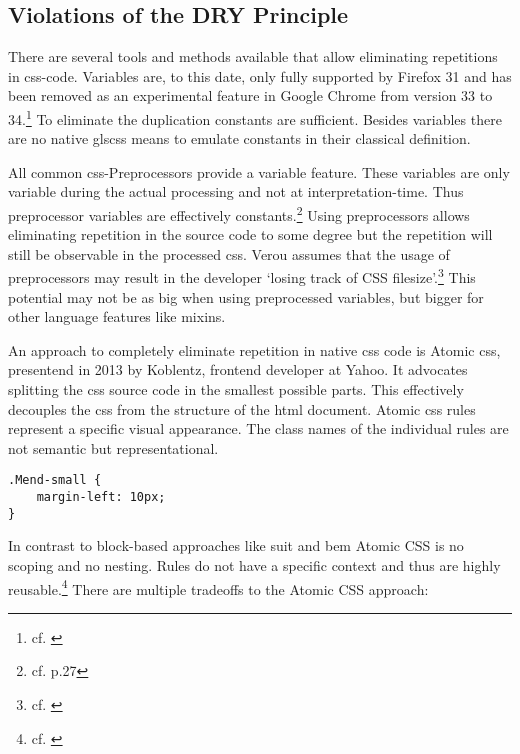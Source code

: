 \subsection{Violations of the DRY Principle}
There are several tools and methods available that allow eliminating repetitions in \gls{css}-code.
Variables are, to this date, only fully supported by Firefox 31 and has been removed as an experimental feature in Google Chrome from version 33 to 34.\footnote{cf. \cite{cssvariables}}
To eliminate the duplication constants are sufficient.
Besides variables there are no native gls{css} means to emulate constants in their classical definition.

All common \gls{css}-Preprocessors provide a variable feature.
These variables are only variable during the actual processing and not at interpretation-time.
Thus preprocessor variables are effectively constants.\footnote{cf. \cite{wirthpreprocessors} p.27}
Using preprocessors allows eliminating repetition in the source code to some degree
but the repetition will still be observable in the processed \gls{css}.
Verou assumes that the usage of preprocessors may result in the developer `losing track of CSS filesize'.\footnote{cf. \cite{veroupreprocessors}}
This potential may not be as big when using preprocessed variables, but bigger for other language features like mixins.

An approach to completely eliminate repetition in native \gls{css} code is Atomic \gls{css}, presentend in 2013 by Koblentz, frontend developer at Yahoo.
It advocates splitting the \gls{css} source code in the smallest possible parts.
This effectively decouples the \gls{css} from the structure of the \gls{html} document.
Atomic \gls{css} rules represent a specific visual appearance.
The class names of the individual rules are not semantic but representational.


\begin{verbatim}
.Mend-small {
    margin-left: 10px;
}
\end{verbatim}

In contrast to block-based approaches like \gls{suit} and \gls{bem} Atomic CSS is no scoping and no nesting.
Rules do not have a specific context and thus are highly reusable.\footnote{cf. \cite{atomiccssarticle}}
There are multiple tradeoffs to the Atomic CSS approach:

